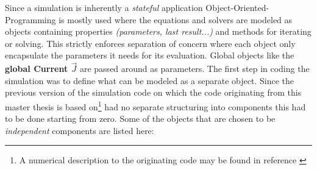 \documentclass[master.tex]{subfiles}
\begin{document}
Since a simulation is inherently a \textit{stateful} application Object-Oriented-Programming is mostly used where the equations and solvers are modeled as objects containing properties \textit{(parameters, last result...)} and methods for iterating or solving. This strictly enforces separation of concern where each object only encapsulate the parameters it needs for its evaluation. Global objects like the \textbf{global Current $\vec{J}$} are passed around as parameters.\newline
The first step in coding the simulation was to define what can be modeled as a separate object. Since the previous version of the simulation code on which the code originating from this master thesis is based on\footnote{A numerical description to the originating code may be found in reference \cite{Kendl_2015-FirstCode}} had no separate structuring into components this had to be done starting from zero.\newline
Some of the objects that are chosen to be \textit{independent} components are listed here:
  
\end{document}
